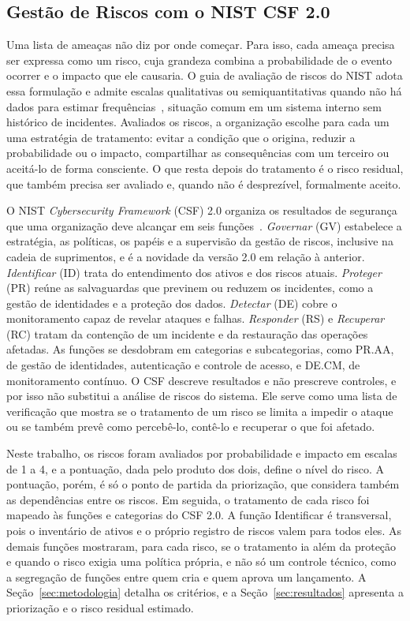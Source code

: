 \documentclass[conference]{IEEEtran}
\begin{document}
\subsection{Gestão de Riscos com o NIST CSF 2.0}

Uma lista de ameaças não diz por onde começar. Para isso, cada ameaça precisa ser expressa como um risco, cuja grandeza combina a probabilidade de o evento ocorrer e o impacto que ele causaria. O guia de avaliação de riscos do NIST adota essa formulação e admite escalas qualitativas ou semiquantitativas quando não há dados para estimar frequências~\cite{nist2012risk}, situação comum em um sistema interno sem histórico de incidentes. Avaliados os riscos, a organização escolhe para cada um uma estratégia de tratamento: evitar a condição que o origina, reduzir a probabilidade ou o impacto, compartilhar as consequências com um terceiro ou aceitá-lo de forma consciente. O que resta depois do tratamento é o risco residual, que também precisa ser avaliado e, quando não é desprezível, formalmente aceito.

O NIST \textit{Cybersecurity Framework} (CSF) 2.0 organiza os resultados de segurança que uma organização deve alcançar em seis funções~\cite{nist2024csf}. \emph{Governar} (GV) estabelece a estratégia, as políticas, os papéis e a supervisão da gestão de riscos, inclusive na cadeia de suprimentos, e é a novidade da versão 2.0 em relação à anterior. \emph{Identificar} (ID) trata do entendimento dos ativos e dos riscos atuais. \emph{Proteger} (PR) reúne as salvaguardas que previnem ou reduzem os incidentes, como a gestão de identidades e a proteção dos dados. \emph{Detectar} (DE) cobre o monitoramento capaz de revelar ataques e falhas. \emph{Responder} (RS) e \emph{Recuperar} (RC) tratam da contenção de um incidente e da restauração das operações afetadas. As funções se desdobram em categorias e subcategorias, como PR.AA, de gestão de identidades, autenticação e controle de acesso, e DE.CM, de monitoramento contínuo. O CSF descreve resultados e não prescreve controles, e por isso não substitui a análise de riscos do sistema. Ele serve como uma lista de verificação que mostra se o tratamento de um risco se limita a impedir o ataque ou se também prevê como percebê-lo, contê-lo e recuperar o que foi afetado.

Neste trabalho, os riscos foram avaliados por probabilidade e impacto em escalas de 1 a 4, e a pontuação, dada pelo produto dos dois, define o nível do risco. A pontuação, porém, é só o ponto de partida da priorização, que considera também as dependências entre os riscos. Em seguida, o tratamento de cada risco foi mapeado às funções e categorias do CSF 2.0. A função Identificar é transversal, pois o inventário de ativos e o próprio registro de riscos valem para todos eles. As demais funções mostraram, para cada risco, se o tratamento ia além da proteção e quando o risco exigia uma política própria, e não só um controle técnico, como a segregação de funções entre quem cria e quem aprova um lançamento. A Seção~\ref{sec:metodologia} detalha os critérios, e a Seção~\ref{sec:resultados} apresenta a priorização e o risco residual estimado.
\end{document}
